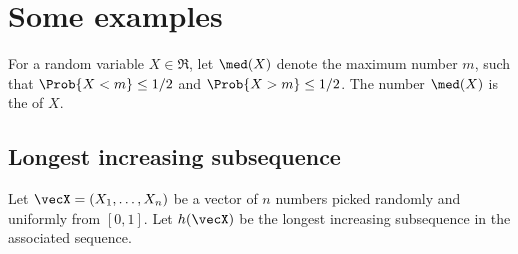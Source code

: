 
\section{Some examples}

\begin{defn}
    For a random variable $X \in \Re$, let $\med(X)$ denote the
    maximum number $m$, such that $\Prob{X < m} \leq 1/2$ and
    $\Prob{X > m} \leq 1/2$. The number $\med(X)$ is the
     of $X$.
\end{defn}


\subsection{Longest increasing subsequence}

Let $\vecX = (X_1, \ldots, X_n)$ be a vector of $n$ numbers picked
randomly and uniformly from $[0,1]$. Let $h(\vecX)$ be the longest
increasing subsequence in the associated sequence.

